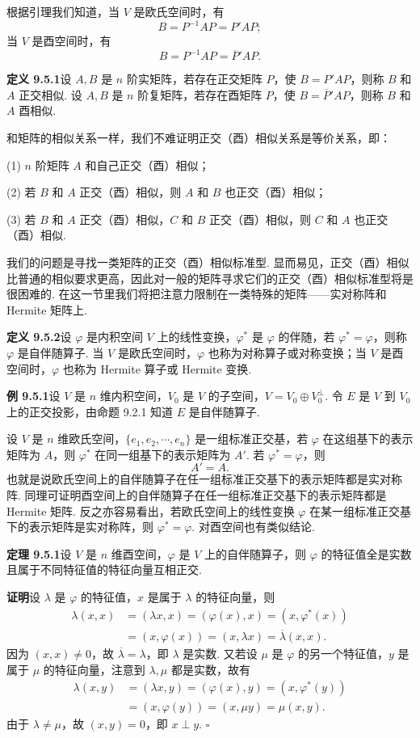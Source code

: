 \documentclass[UTF8, 12pt, fontset=fandol, oneside]{ctexart}
\begin{document}
根据引理我们知道，当 $V$ 是欧氏空间时，有
\[
  B=P^{-1}AP=P'AP;
\]
当 $V$ 是酉空间时，有
\[
  B=P^{-1}AP=\overline P'AP.
\]

\noindent\textbf{定义 9.5.1}\quad 设 $A,B$ 是 $n$ 阶实矩阵，若存在正交矩阵 $P$，使 $B=P'AP$，则称 $B$ 和 $A$ 正交相似. 设 $A,B$ 是 $n$ 阶复矩阵，若存在酉矩阵 $P$，使 $B=\overline P'AP$，则称 $B$ 和 $A$ 酉相似.

和矩阵的相似关系一样，我们不难证明正交（酉）相似关系是等价关系，即：

(1) $n$ 阶矩阵 $A$ 和自己正交（酉）相似；

(2) 若 $B$ 和 $A$ 正交（酉）相似，则 $A$ 和 $B$ 也正交（酉）相似；

(3) 若 $B$ 和 $A$ 正交（酉）相似，$C$ 和 $B$ 正交（酉）相似，则 $C$ 和 $A$ 也正交（酉）相似.

我们的问题是寻找一类矩阵的正交（酉）相似标准型. 显而易见，正交（酉）相似比普通的相似要求更高，因此对一般的矩阵寻求它们的正交（酉）相似标准型将是很困难的. 在这一节里我们将把注意力限制在一类特殊的矩阵——实对称阵和 Hermite 矩阵上.

\noindent\textbf{定义 9.5.2}\quad 设 $\varphi$ 是内积空间 $V$ 上的线性变换，$\varphi^*$ 是 $\varphi$ 的伴随，若 $\varphi^*=\varphi$，则称 $\varphi$ 是自伴随算子. 当 $V$ 是欧氏空间时，$\varphi$ 也称为对称算子或对称变换；当 $V$ 是酉空间时，$\varphi$ 也称为 Hermite 算子或 Hermite 变换.

\noindent\textbf{例 9.5.1}\quad 设 $V$ 是 $n$ 维内积空间，$V_0$ 是 $V$ 的子空间，$V=V_0\oplus V_0^\perp$. 令 $E$ 是 $V$ 到 $V_0$ 上的正交投影，由命题 9.2.1 知道 $E$ 是自伴随算子.

设 $V$ 是 $n$ 维欧氏空间，$\{e_1,e_2,\cdots,e_n\}$ 是一组标准正交基，若 $\varphi$ 在这组基下的表示矩阵为 $A$，则 $\varphi^*$ 在同一组基下的表示矩阵为 $A'$. 若 $\varphi^*=\varphi$，则
\[
  A'=A.
\]
也就是说欧氏空间上的自伴随算子在任一组标准正交基下的表示矩阵都是实对称阵. 同理可证明酉空间上的自伴随算子在任一组标准正交基下的表示矩阵都是 Hermite 矩阵. 反之亦容易看出，若欧氏空间上的线性变换 $\varphi$ 在某一组标准正交基下的表示矩阵是实对称阵，则 $\varphi^*=\varphi$. 对酉空间也有类似结论.

\noindent\textbf{定理 9.5.1}\quad 设 $V$ 是 $n$ 维酉空间，$\varphi$ 是 $V$ 上的自伴随算子，则 $\varphi$ 的特征值全是实数且属于不同特征值的特征向量互相正交.

\noindent\textbf{证明}\quad 设 $\lambda$ 是 $\varphi$ 的特征值，$x$ 是属于 $\lambda$ 的特征向量，则
\[
\begin{aligned}
  \lambda(x,x)
  &=(\lambda x,x)=(\varphi(x),x)=(x,\varphi^*(x))\\
  &=(x,\varphi(x))=(x,\lambda x)=\overline\lambda(x,x).
\end{aligned}
\]
因为 $(x,x)\ne0$，故 $\overline\lambda=\lambda$，即 $\lambda$ 是实数. 又若设 $\mu$ 是 $\varphi$ 的另一个特征值，$y$ 是属于 $\mu$ 的特征向量，注意到 $\lambda,\mu$ 都是实数，故有
\[
\begin{aligned}
  \lambda(x,y)
  &=(\lambda x,y)=(\varphi(x),y)=(x,\varphi^*(y))\\
  &=(x,\varphi(y))=(x,\mu y)=\mu(x,y).
\end{aligned}
\]
由于 $\lambda\ne\mu$，故 $(x,y)=0$，即 $x\perp y$. $\square$
\end{document}
